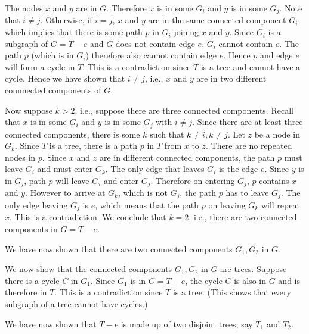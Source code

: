 The nodes $x$ and $y$ are in $G$.
Therefore $x$ is in some $G_i$ and $y$ is in some $G_j$.
Note that $i \neq j$.
Otherwise, if $i = j$, $x$ and $y$ are in the same connected component
$G_i$ which implies that there is some path $p$ in $G_i$ joining $x$ and $y$.
Since $G_i$ is a subgraph of $G = T - e$ and $G$ does not contain edge $e$,
$G_i$ cannot contain $e$.
The path $p$ (which is in $G_i$) therefore also cannot contain edge $e$.
Hence $p$ and edge $e$ will form a cycle in $T$.
This is a contradiction since $T$ is a tree and cannot have a cycle.
Hence we have shown that $i \neq j$, i.e., $x$ and $y$ are in two different
connnected components of $G$.

Now suppose $k > 2$, i.e.,
suppose there are three connected components.
Recall that $x$ is in some $G_i$ and $y$ is in some $G_j$
with $i \neq j$.
Since there are at least three connected components, there is some
$k$
such that $k \neq i, k \neq j$. 
Let $z$ be a node in $G_k$.
Since $T$ is a tree, there is a path $p$ in $T$ from $x$ to $z$.
There are no repeated nodes in $p$. 
Since $x$ and $z$ are in different connected components,
the path $p$ must leave $G_i$ and must enter $G_k$.
The only edge that leaves $G_i$ is the edge $e$.
Since $y$ is in $G_j$,
path $p$ will leave $G_i$ and enter $G_j$.
Therefore on entering $G_j$, $p$ contains $x$ and $y$.
However to arrive at $G_k$, which is not $G_j$,
the path $p$ has to leave $G_j$.
The only edge leaving $G_j$ is $e$, which means that
the path $p$ on leaving $G_k$ will repeat $x$.
This is a contradiction.
We conclude that $k = 2$, i.e., there are two
connected components in $G = T - e$.

We have now shown that there are two connected components $G_1, G_2$ in $G$.

We now show that the connected components $G_1, G_2$ in $G$
are trees.
Suppose there is a cycle $C$ in $G_1$.
Since $G_1$ is in $G = T - e$, the cycle $C$ is also in $G$
and is therefore in $T$.
This is a contradiction since $T$ is a tree.
(This shows that every subgraph of a tree cannot have cycles.)

We have now shown that $T - e$ is made up of two
disjoint trees, say $T_1$ and $T_2$.

